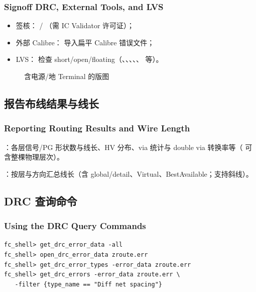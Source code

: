 \subsubsection*{Signoff DRC, External Tools, and LVS}

\begin{itemize}
  \item 签核： / （需 IC Validator 许可证）；
  \item 外部 Calibre： 导入扁平 Calibre 错误文件；
  \item LVS： 检查 short/open/floating（、、、、、 等）。
\end{itemize}

\begin{figure}[htbp]
\centering
{}
\caption{含电源/地 Terminal 的版图}
\label{fig:pg-terminals}
\end{figure}

\subsection{报告布线结果与线长}
\subsubsection*{Reporting Routing Results and Wire Length}

：各层信号/PG 形状数与线长、HV 分布、via 统计与 double via 转换率等（ 可含整棵物理层次）。

：按层与方向汇总线长（含 global/detail、Virtual、BestAvailable；支持斜线）。

\subsection{DRC 查询命令}
\subsubsection*{Using the DRC Query Commands}

\begin{lstlisting}
fc_shell> get_drc_error_data -all
fc_shell> open_drc_error_data zroute.err
fc_shell> get_drc_error_types -error_data zroute.err
fc_shell> get_drc_errors -error_data zroute.err \
   -filter {type_name == "Diff net spacing"}
\end{lstlisting}

